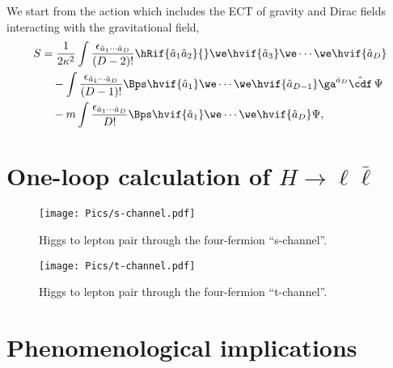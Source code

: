 \documentclass[twocolumn,aps,prd,showkeys,showpacs,groupedaddress,byrevtex]{revtex4-1}
\begin{document}
We start from the action which includes the ECT of gravity and Dirac fields interacting with the gravitational field,
\begin{equation}
  \begin{split}
    S &= \frac{1}{2\kappa^2}\int\frac{\epsilon_{\hat{a}_1\cdots \hat{a}_D}}{(D-2)!}\hRif{\hat{a}_1 \hat{a}_2}{} \we \hvif{\hat{a}_3} \we \cdots \we \hvif{\hat{a}_D} \\
    & \quad - \int \frac{\epsilon_{\hat{a}_1\cdots \hat{a}_D}}{(D-1)!} \Bps \hvif{\hat{a}_1} \we \cdots \we \hvif{\hat{a}_{D-1}}\ga^{\hat{a}_D} \hat{\cdf} \, \Psi \\
    & \quad - m \int\frac{\epsilon_{\hat{a}_1\cdots \hat{a}_D}}{D!} \Bps \hvif{\hat{a}_1} \we \cdots \we \hvif{\hat{a}_{D}} \Psi,
  \end{split}
\end{equation}


\section{\label{1loop}One-loop calculation of $H \to \ell \bar{\ell}$}
  

\begin{figure}[ht]
  \texttt{[image: Pics/s-channel.pdf]}
  \caption{Higgs to lepton pair through the four-fermion \mbox{``s-channel''.}}  
\end{figure}

\begin{figure}[ht]
  \texttt{[image: Pics/t-channel.pdf]}
  \caption{Higgs to lepton pair through the four-fermion \mbox{``t-channel''.}}  
\end{figure}


\section{\label{phenom}Phenomenological implications}



\nocite{GonzalezGarcia:1998ay}%



\end{document}
